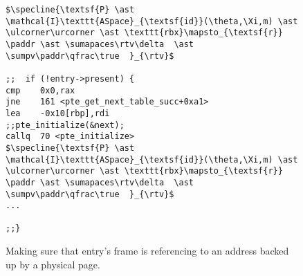 \begin{figure}\footnotesize
\begin{lstlisting}[mathescape]
$\specline{\textsf{P} \ast \mathcal{I}\texttt{ASpace}_{\textsf{id}}(\theta,\Xi,m) \ast \ulcorner\urcorner \ast \texttt{rbx}\mapsto_{\textsf{r}} \paddr \ast \sumapaces\rtv\delta  \ast \sumpv\paddr\qfrac\true  }_{\rtv}$

;;  if (!entry->present) {
cmp    0x0,rax
jne    161 <pte_get_next_table_succ+0xa1>
lea    -0x10[rbp],rdi
;;pte_initialize(&next);
callq  70 <pte_initialize>
$\specline{\textsf{P} \ast \mathcal{I}\texttt{ASpace}_{\textsf{id}}(\theta,\Xi,m) \ast \ulcorner\urcorner \ast \texttt{rbx}\mapsto_{\textsf{r}} \paddr \ast \sumapaces\rtv\delta  \ast \sumpv\paddr\qfrac\true  }_{\rtv}$
...

;;}
\end{lstlisting}
\vspace{-1em}
\caption{Making sure that \textsf{entry}'s frame is referencing to an address backed up by a physical page.}
\label{fig:calltopteinitialize}
\end{figure}

